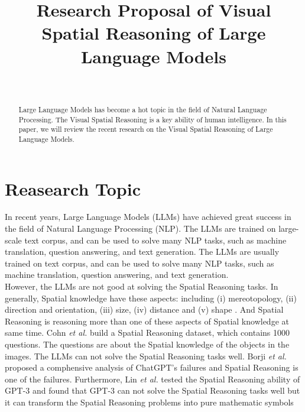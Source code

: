 \documentclass[journal,10pt]{IEEEtran}
\author{
    \IEEEauthorblockN{Jinlong Liu}\\
    \IEEEauthorblockA{Department of Computer Science, University of Liverpool
    \\J.Liu157@liverpool.ac.uk}
}
\title{Research Proposal of Visual Spatial Reasoning of Large Language Models}
\begin{document}
\maketitle
\begin{abstract}
Large Language Models has become a hot topic in the field of Natural Language Processing. The Visual Spatial Reasoning is a key ability of human intelligence. In this paper, we will review the recent research on the Visual Spatial Reasoning of Large Language Models.
\end{abstract}
\section{Reasearch Topic}
In recent years, Large Language Models (LLMs) have achieved great success in the field of Natural Language Processing (NLP). The LLMs are trained on large-scale text corpus, and can be used to solve many NLP tasks, such as machine translation, question answering, and text generation. The LLMs are usually trained on text corpus, and can be used to solve many NLP tasks, such as machine translation, question answering, and text generation. \\
However, the LLMs are not good at solving the Spatial Reasoning tasks. In generally, Spatial knowledge have these aspects: including (i) mereotopology, (ii) direction and orientation, (iii) size, (iv) distance and (v) shape \cite{cohn2008qualitative}. And Spatial Reasoning is  reasoning more than one of these aspects of Spatial knowledge at same time. Cohn \textit{et al.} \cite{cohn2023dialectical} build a Spatial Reasoning dataset, which contains 1000 questions. The questions are about the Spatial knowledge of the objects in the images. The LLMs can not solve the Spatial Reasoning tasks well. Borji \textit{et al.} \cite{borji2023categorical} proposed a comphensive analysis of ChatGPT's failures and Spatial Reasoning is one of the failures. Furthermore, Lin \textit{et al.} \cite{lin2023using} tested the Spatial Reasoning ability of GPT-3 and found that GPT-3 can not solve the Spatial Reasoning tasks well but it can transform the Spatial Reasoning problems into pure mathematic symbols \\




\end{document}
